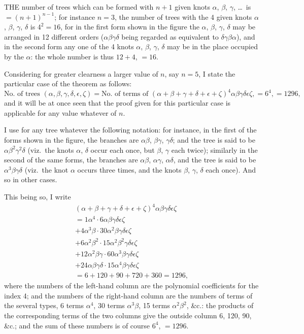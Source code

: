 \documentclass[11pt,a4paper]{book}
\begin{document}
THE number of trees which can be formed with $n + 1$ given knots $\alpha$, $\beta$, $\gamma$, \ldots\ is $= (n+1)^{n-1}$; for instance $n = 3$, the number of trees with the 4 given knots $\alpha$, $\beta$, $\gamma$, $\delta$ is $4^2 = 16$, for in the first form shown in the figure the $\alpha$, $\beta$, $\gamma$, $\delta$ may be arranged in 12 different orders ($\alpha\beta\gamma\delta$ being regarded as equivalent to $\delta\gamma\beta\alpha$), and in the second form any one of the 4 knots $\alpha$, $\beta$, $\gamma$, $\delta$ may be in the place occupied by the $\alpha$: the whole number is thus $12 + 4$, $= 16$.

Considering for greater clearness a larger value of $n$, say $n = 5$, I state the particular case of the theorem as follows:
\[
\text{No.\ of trees }(\alpha, \beta, \gamma, \delta, \epsilon, \zeta) = \text{No.\ of terms of }(\alpha + \beta + \gamma + \delta + \epsilon + \zeta)^4 \alpha\beta\gamma\delta\epsilon\zeta, = 6^4, = 1296,
\]
and it will be at once seen that the proof given for this particular case is applicable for any value whatever of $n$.

I use for any tree whatever the following notation: for instance, in the first of the forms shown in the figure, the branches are $\alpha\beta$, $\beta\gamma$, $\gamma\delta$; and the tree is said to be $\alpha\beta^2\gamma^2\delta$ (viz.\ the knots $\alpha$, $\delta$ occur each once, but $\beta$, $\gamma$ each twice); similarly in the second of the same forms, the branches are $\alpha\beta$, $\alpha\gamma$, $\alpha\delta$, and the tree is said to be $\alpha^3\beta\gamma\delta$ (viz.\ the knot $\alpha$ occurs three times, and the knots $\beta$, $\gamma$, $\delta$ each once). And so in other cases.

This being so, I write
\begin{multline*}
(\alpha + \beta + \gamma + \delta + \epsilon + \zeta)^4 \alpha\beta\gamma\delta\epsilon\zeta \\
= 1\alpha^4 \cdot 6\alpha\beta\gamma\delta\epsilon\zeta \\
+ 4\alpha^3\beta \cdot 30\alpha^2\beta\gamma\delta\epsilon\zeta \\
+ 6\alpha^2\beta^2 \cdot 15\alpha^2\beta^2\gamma\delta\epsilon\zeta \\
+ 12\alpha^2\beta\gamma \cdot 60\alpha^3\beta\gamma\delta\epsilon\zeta \\
+ 24\alpha\beta\gamma\delta \cdot 15\alpha^4\beta\gamma\delta\epsilon\zeta \\
= 6 + 120 + 90 + 720 + 360 = 1296,
\end{multline*}
where the numbers of the left-hand column are the polynomial coefficients for the index 4; and the numbers of the right-hand column are the numbers of terms of the several types, 6 terms $\alpha^4$, 30 terms $\alpha^3\beta$, 15 terms $\alpha^2\beta^2$, \&c.: the products of the corresponding terms of the two columns give the outside column 6, 120, 90, \&c.; and the sum of these numbers is of course $6^4$, $= 1296$.
\end{document}
